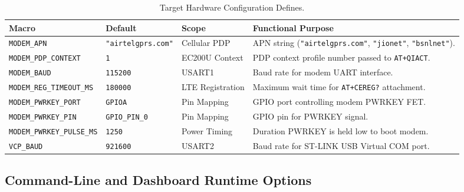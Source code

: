 \documentclass[11pt,a4paper]{article}
\newcommand{\code}[1]{\texttt{#1}}
\begin{document}
\begin{table}[htbp]
\centering
\small
\begin{tabularx}{\textwidth}{l l l X}
\toprule
\textbf{Macro} & \textbf{Default} & \textbf{Scope} & \textbf{Functional Purpose} \\
\midrule
\code{MODEM\_APN} & \code{"airtelgprs.com"} & Cellular PDP & APN string (\code{"airtelgprs.com"}, \code{"jionet"}, \code{"bsnlnet"}). \\
\code{MODEM\_PDP\_CONTEXT} & \code{1} & EC200U Context & PDP context profile number passed to \code{AT+QIACT}. \\
\code{MODEM\_BAUD} & \code{115200} & USART1 & Baud rate for modem UART interface. \\
\code{MODEM\_REG\_TIMEOUT\_MS} & \code{180000} & LTE Registration & Maximum wait time for \code{AT+CEREG?} attachment. \\
\code{MODEM\_PWRKEY\_PORT} & \code{GPIOA} & Pin Mapping & GPIO port controlling modem PWRKEY FET. \\
\code{MODEM\_PWRKEY\_PIN} & \code{GPIO\_PIN\_0} & Pin Mapping & GPIO pin for PWRKEY signal. \\
\code{MODEM\_PWRKEY\_PULSE\_MS}& \code{1250} & Power Timing & Duration PWRKEY is held low to boot modem. \\
\code{VCP\_BAUD} & \code{921600} & USART2 & Baud rate for ST-LINK USB Virtual COM port. \\
\bottomrule
\end{tabularx}
\caption{Target Hardware Configuration Defines.}
\label{tab:hw_params}
\end{table}

\subsection{Command-Line and Dashboard Runtime Options}
\end{document}
